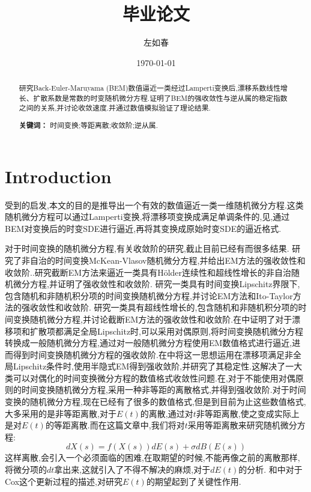 \documentclass[12pt,final]{article}
\title{毕业论文}
\author{左如春}
\date{\today}
\theoremstyle{plain}
\theoremstyle{Definition}
\theoremstyle{Remark}
\begin{document}
	
	\maketitle
	
	\begin{abstract}
		研究Back-Euler-Maruyama (BEM)数值逼近一类经过Lamperti变换后,漂移系数线性增长、扩散系数是常数的时变随机微分方程.证明了BEM的强收敛性与逆从属的稳定指数之间的关系,并讨论收敛速度.并通过数值模拟验证了理论结果.
		
		\medskip
		\noindent\textbf{关键词：} 时间变换;等距离散;收敛阶;逆从属.
	\end{abstract}
	
	
	
	
	
	\section{Introduction}
	
	受到\cite{Alfonsi2013602}的启发,本文的目的是推导出一个有效的数值逼近一类一维随机微分方程.这类随机微分方程可以通过Lamperti变换,将漂移项变换成满足单调条件的,见\cite{iacus2008simulation},通过BEM对变换后的时变SDE进行逼近,再将其变换成原始时变SDE的逼近格式.
	
	对于时间变换的随机微分方程,有关收敛阶的研究,截止目前已经有而很多结果.\cite{wen2023strong}
	研究了非自治的时间变换McKean-Vlasov随机微分方程,并给出EM方法的强收敛性和收敛阶.\cite{liu2020truncated}.研究截断EM方法来逼近一类具有Hölder连续性和超线性增长的非自治随机微分方程,并证明了强收敛性和收敛阶.\cite{jin2021strong}
	研究一类具有时间变换Lipschitz界限下,包含随机和非随机积分项的时间变换随机微分方程,并讨论EM方法和Ito-Taylor方法的强收敛性和收敛阶.\cite{li2023convergence}
	研究一类具有超线性增长的,包含随机和非随机积分项的时间变换随机微分方程,并讨论截断EM方法的强收敛性和收敛阶.在\cite{jum2014strong}中证明了对于漂移项和扩散项都满足全局Lipschitz时,可以采用对偶原则,将时间变换随机微分方程转换成一般随机微分方程,通过对一般随机微分方程使用EM数值格式进行逼近,进而得到时间变换随机微分方程的强收敛阶.在\cite{deng2020semi}中将这一思想运用在漂移项满足非全局Lipschitz条件时,使用半隐式EM得到强收敛阶,并研究了其稳定性.这解决了一大类可以对偶化的时间变换微分方程的数值格式收敛性问题.在\cite{jin2019strong},对于不能使用对偶原则的时间变换随机微分方程,采用一种非等距的离散格式,并得到强收敛阶.对于时间变换的随机微分方程,现在已经有了很多的数值格式,但是到目前为止这些数值格式,大多采用的是非等距离散,对于$E(t)$的离散,通过对$t$非等距离散,使之变成实际上是对$E(t)$的等距离散.而在这篇文章中,我们将对$t$采用等距离散来研究随机微分方程:
	\begin{equation}\label{basic SDE}
		dX(s)=f(X(s))dE(s)+\sigma dB(E(s))
	\end{equation}
	这样离散,会引入一个必须面临的困难,在取期望的时候,不能再像之前的离散那样,将微分项的$dt$拿出来,这就引入了不得不解决的麻烦,对于$dE(t)$的分析.
	\cite{daley2003introduction}和\cite{magdziarz2009stochastic}中对于Cox这个更新过程的描述,对研究$E(t)$的期望起到了关键性作用.
	
\end{document}
